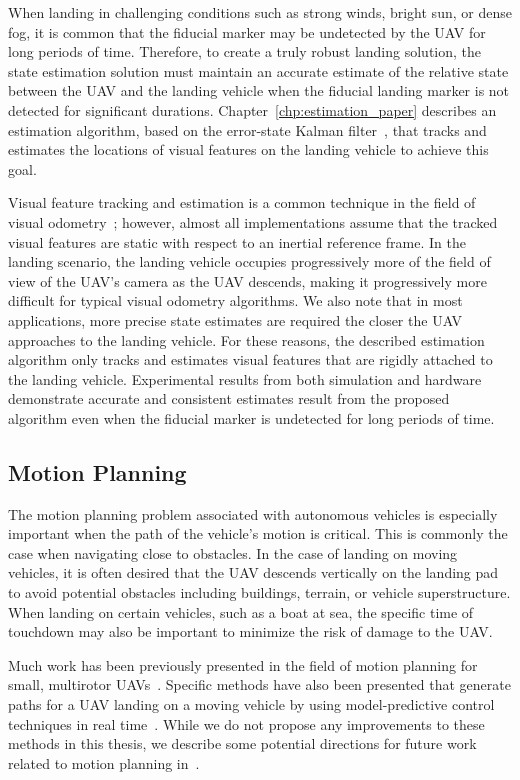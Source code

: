 When landing in challenging conditions such as strong winds, bright sun, or
dense fog, it is common that the fiducial marker may be undetected by the UAV
for long periods of time. Therefore, to create a truly robust landing solution,
the state estimation solution must maintain an accurate estimate of the relative
state between the UAV and the landing vehicle when the fiducial landing marker
is not detected for significant durations. Chapter~\ref{chp:estimation_paper}
describes an estimation algorithm, based on the error-state Kalman
filter~\cite{roumeliotis1999circumventing}, that tracks and estimates the locations of
visual features on the landing vehicle to achieve this goal.

Visual feature
tracking and estimation is a common technique in the field of visual
odometry~\cite{qin2018vins}; however, almost all implementations assume that the
tracked visual features are static with respect to an inertial reference frame.
In the landing scenario, the landing vehicle occupies progressively more of the
field of view of the UAV's camera as the UAV descends, making it progressively
more difficult for typical visual odometry algorithms. We also note that in most
applications, more precise state estimates are required the closer the UAV
approaches
to the landing vehicle. For these reasons, the described estimation algorithm
only tracks and estimates visual features that are rigidly attached to the landing vehicle.
Experimental results
from both simulation and hardware demonstrate accurate and consistent estimates
result from the proposed algorithm even when the fiducial marker is undetected
for long periods of time.

\subsection{Motion Planning}
The motion planning problem associated with autonomous vehicles is especially
important when the path of the vehicle's motion is critical.
This is commonly the case when
navigating close to obstacles. In the case of landing on moving vehicles, it is
often desired that the UAV descends vertically on the landing pad to avoid
potential obstacles including buildings, terrain, or vehicle superstructure.
When landing on certain vehicles, such as a boat at sea, the specific time of
touchdown may also be important to minimize the risk of damage to the UAV.

Much work has been previously presented in the field of motion planning for
small, multirotor UAVs~\cite{mellinger2011minimum}. Specific methods have also been 
presented that generate paths for a UAV landing on a moving
vehicle by using model-predictive control techniques in real time~\cite{baca2019autonomous}.
While we do not propose any improvements to these methods in this thesis, we
describe some potential directions for future work related to motion planning
in~.

